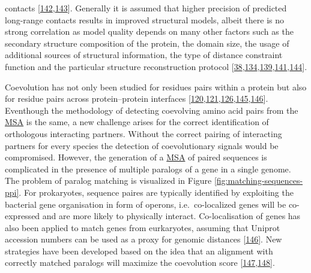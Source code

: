 \documentclass[11pt,a4paper,twoside]{book}
\theoremstyle{definition}
\theoremstyle{definition}
\theoremstyle{remark}
\begin{document}
contacts
{[}\protect\hyperlink{ref-Wang2016}{142},\protect\hyperlink{ref-Adhikari2015a}{143}{]}.
Generally it is assumed that higher precision of predicted long-range
contacts results in improved structural models, albeit there is no
strong correlation as model quality depends on many other factors such
as the secondary structure composition of the protein, the domain size,
the usage of additional sources of structural information, the type of
distance constraint function and the particular structure reconstruction
protocol
{[}\protect\hyperlink{ref-Marks2011}{38},\protect\hyperlink{ref-Kosciolek2014}{134},\protect\hyperlink{ref-Adhikari2017}{139},\protect\hyperlink{ref-Zhang2003}{141},\protect\hyperlink{ref-DeOliveira2016}{144}{]}.

Coevolution has not only been studied for residues pairs within a
protein but also for residue pairs across protein--protein interfaces
{[}\protect\hyperlink{ref-Ovchinnikov2014a}{120},\protect\hyperlink{ref-Hopf2014}{121},\protect\hyperlink{ref-Ovchinnikov2015a}{126},\protect\hyperlink{ref-Rodriguez-Rivas2016}{145},\protect\hyperlink{ref-Feinauer2016a}{146}{]}.
Eventhough the methodology of detecting coevolving amino acid pairs from
the \protect\hyperlink{abbrev}{MSA} is the same, a new challenge arises
for the correct identification of orthologous interacting partners.
Without the correct pairing of interacting partners for every species
the detection of coevolutionary signals would be compromised. However,
the generation of a \protect\hyperlink{abbrev}{MSA} of paired sequences
is complicated in the presence of multiple paralogs of a gene in a
single genome. The problem of paralog matching is visualized in Figure
\ref{fig:matching-sequences-ppi}. For prokaryotes, sequence paires are
typically identified by exploiting the bacterial gene organisation in
form of operons, i.e.~co-localized genes will be co-expressed and are
more likely to physically interact. Co-localisation of genes has also
been applied to match genes from eurkaryotes, assuming that Uniprot
accession numbers can be used as a proxy for genomic distances
{[}\protect\hyperlink{ref-Feinauer2016a}{146}{]}. New strategies have
been developed based on the idea that an alignment with correctly
matched paralogs will maximize the coevolution score
{[}\protect\hyperlink{ref-Gueudre2016}{147},\protect\hyperlink{ref-Bitbol2016}{148}{]}.
\end{document}
